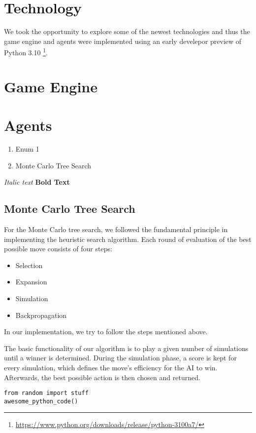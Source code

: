 \section{Technology}
We took the opportunity to explore some of the newest technologies
and thus the game engine and agents were implemented using an early develepor preview of Python 3.10
\footnote{\url{https://www.python.org/downloads/release/python-3100a7/}}.

\section{Game Engine}

\section{Agents}
\begin{enumerate}
	\item Enum 1
	\item Monte Carlo Tree Search
\end{enumerate}

\textit{Italic text}
\textbf{Bold Text}

\subsection{Monte Carlo Tree Search}
For the Monte Carlo tree search, we followed the fundamental principle in implementing the heuristic search algorithm. Each round of evaluation of the best possible move consists of four steps:
\begin{itemize}
    \item Selection
    \item Expansion
    \item Simulation
    \item Backpropagation
\end{itemize}
In our implementation, we try to follow the steps mentioned above.

The basic functionality of our algorithm is to play a given number of simulations until a winner is determined. During the simulation phase, a score is kept for every simulation, which defines the move's efficiency for the AI to win. Afterwards, the best possible action is then chosen and returned.                                     
\lstset{language=Python}
\begin{lstlisting}
from random import stuff
awesome_python_code()
\end{lstlisting}
